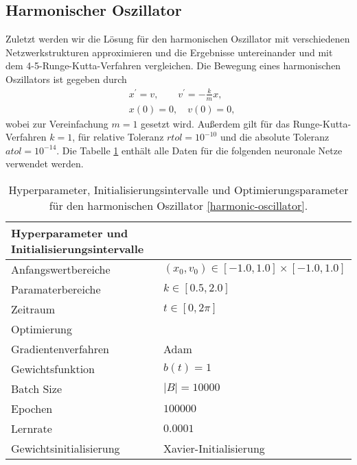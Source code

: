 \subsection{Harmonischer Oszillator}
\label{sec:harmonischer-oszillator}
Zuletzt werden wir die Lösung für den harmonischen Oszillator mit verschiedenen Netzwerkstrukturen approximieren und
die Ergebnisse untereinander und mit dem 4-5-Runge-Kutta-Verfahren vergleichen. Die Bewegung eines harmonischen
Oszillators ist gegeben durch
\begin{align}
       \label{harmonic-oscillator}
       &x^{\prime}=v, \qquad v^{\prime}=-\frac{k}{m}x, \\
       &x(0)=0, \quad v(0)=0, \nonumber
\end{align}
wobei zur Vereinfachung $m=1$ gesetzt wird. Außerdem gilt für das Runge-Kutta-Verfahren $k=1$, für relative Toleranz
$rtol = 10^{-10}$ und die absolute Toleranz $atol = 10^{-14}$. Die Tabelle \ref{stiff-table-data} enthält alle Daten
für die folgenden neuronale Netze verwendet werden.
\begin{table}
       \renewcommand{\arraystretch}{1.0}
       \centering
       \begin{tabular}{ l | l }
              \hline
              Hyperparameter und Initialisierungsintervalle & \\
              \hline
              Anfangswertbereiche &
              $(x_{0},v_0) \in [-1.0, 1.0] \times [-1.0, 1.0]$ \\
              Paramaterbereiche & $k \in [0.5, 2.0]$ \\
              Zeitraum & $t \in [0, 2\pi]$ \\
              \hline
              Optimierung & \\
              \hline
              Gradientenverfahren & Adam \\
              Gewichtsfunktion & $b(t)=1$ \\
              Batch Size & $|B|=10000$ \\
              Epochen & $100000$ \\
              Lernrate & $0.0001$ \\
              Gewichtsinitialisierung & Xavier-Initialisierung \\
              \hline
       \end{tabular}
       \caption{Hyperparameter, Initialisierungsintervalle und Optimierungsparameter für den harmonischen Oszillator
       \eqref{harmonic-oscillator}.}
       \label{stiff-table-data}
\end{table}
